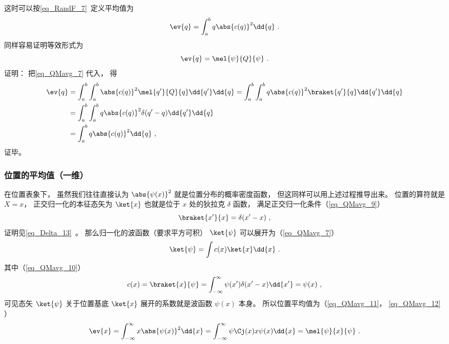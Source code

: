 这时可以按\autoref{eq_RandF_7}~定义平均值为
\begin{equation}\label{eq_QMavg_11}
\ev{q} = \int_a^b q \abs{c(q)}^2 \dd{q}~.
\end{equation}
同样容易证明等效形式为
\begin{equation}\label{eq_QMavg_12}
\ev{q} = \mel{\psi}{Q}{\psi}~.
\end{equation}
证明： 把\autoref{eq_QMavg_7} 代入， 得
\begin{equation}
\begin{aligned}
\ev{q} &= \int_a^b\int_a^b \abs{c(q)}^2\mel{q'}{Q}{q} \dd{q'}\dd{q} = \int_a^b\int_a^b q\abs{c(q)}^2\braket{q'}{q} \dd{q'}\dd{q}\\
&= \int_a^b\int_a^b q\abs{c(q)}^2\delta(q'-q) \dd{q'}\dd{q}\\
&= \int_a^b q\abs{c(q)}^2 \dd{q}~,
\end{aligned}
\end{equation}
证毕。

\subsubsection{位置的平均值（一维）}
在位置表象下， 虽然我们往往直接认为 $\abs{\psi(x)}^2$ 就是位置分布的概率密度函数， 但这同样可以用上述过程推导出来。 位置的算符就是 $X = x$， 正交归一化的本征态矢为 $\ket{x}$ 也就是位于 $x$ 处的狄拉克 $\delta$ 函数， 满足正交归一化条件（\autoref{eq_QMavg_9}）
\begin{equation}
\braket{x'}{x} = \delta(x'-x)~,
\end{equation}
证明见\autoref{eq_Delta_13}~。 那么归一化的波函数（要求平方可积） $\ket{\psi}$ 可以展开为（\autoref{eq_QMavg_7}）
\begin{equation}
\ket{\psi} = \int c(x) \ket{x}\dd{x}~.
\end{equation}
其中（\autoref{eq_QMavg_10}）
\begin{equation}
c(x) = \braket{x}{\psi} = \int_{-\infty}^\infty \psi(x')\delta(x'-x)\dd{x'} = \psi(x)~,
\end{equation}
可见态矢 $\ket{\psi}$ 关于位置基底 $\ket{x}$ 展开的系数就是波函数 $\psi(x)$ 本身。 所以位置平均值为（\autoref{eq_QMavg_11}， \autoref{eq_QMavg_12} ）
\begin{equation}
\ev{x} = \int_{-\infty}^\infty x \abs{\psi(x)}^2 \dd{x} = \int_{-\infty}^\infty \psi\Cj(x)x \psi(x) \dd{x} = \mel{\psi}{x}{\psi}~.
\end{equation}


